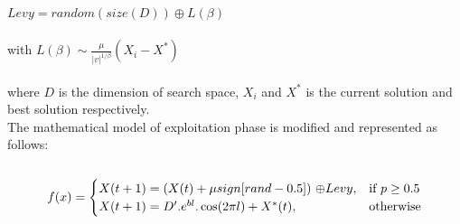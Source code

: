 \documentclass[a4paper]{article}
\begin{document}
$Levy = random(size(D)) \oplus L(\beta)$ \\ \\
with $L(\beta) \sim \frac{\mu}{|v|^{1/\beta}}(X_i - X^*)$ \\ \\
where $D$ is the dimension of search space, $X_i$ and $X^*$ is the current solution and best solution respectively. \\
The mathematical model of exploitation phase is modified and represented as follows: \\ \\
\[
    f(x)= 
\begin{cases}
    X(t+1) = (X(t) + \mu sign[rand - 0.5])$ $\oplus  Levy,& \text{if } p\geq 0.5\\
    X(t+1) = D'.e^{bl}.\cos(2\pi l) + X^*(t),              & \text{otherwise}
\end{cases}
\]
\end{document}

